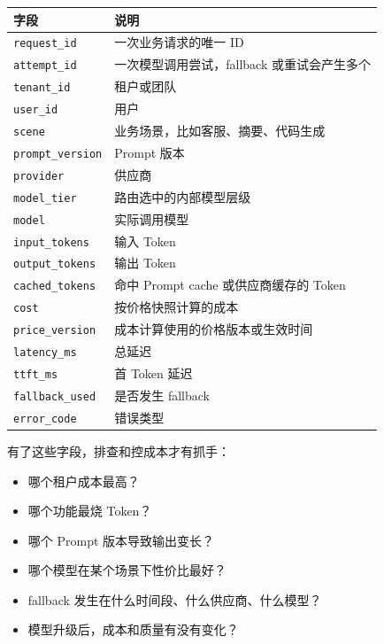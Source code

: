 \documentclass[10pt,a4paper]{ctexart}
\begin{document}
{\footnotesize
\begin{tabularx}{\textwidth}{|X|X|}
\hline
\textbf{字段} & \textbf{说明} \\
\hline
\texttt{request\_id} & 一次业务请求的唯一 ID \\
\hline
\texttt{attempt\_id} & 一次模型调用尝试，fallback 或重试会产生多个 \\
\hline
\texttt{tenant\_id} & 租户或团队 \\
\hline
\texttt{user\_id} & 用户 \\
\hline
\texttt{scene} & 业务场景，比如客服、摘要、代码生成 \\
\hline
\texttt{prompt\_version} & Prompt 版本 \\
\hline
\texttt{provider} & 供应商 \\
\hline
\texttt{model\_tier} & 路由选中的内部模型层级 \\
\hline
\texttt{model} & 实际调用模型 \\
\hline
\texttt{input\_tokens} & 输入 Token \\
\hline
\texttt{output\_tokens} & 输出 Token \\
\hline
\texttt{cached\_tokens} & 命中 Prompt cache 或供应商缓存的 Token \\
\hline
\texttt{cost} & 按价格快照计算的成本 \\
\hline
\texttt{price\_version} & 成本计算使用的价格版本或生效时间 \\
\hline
\texttt{latency\_ms} & 总延迟 \\
\hline
\texttt{ttft\_ms} & 首 Token 延迟 \\
\hline
\texttt{fallback\_used} & 是否发生 fallback \\
\hline
\texttt{error\_code} & 错误类型 \\
\hline
\end{tabularx}
}



有了这些字段，排查和控成本才有抓手：


\begin{itemize}[itemsep=2pt, topsep=4pt]
  \item 哪个租户成本最高？
  \item 哪个功能最烧 Token？
  \item 哪个 Prompt 版本导致输出变长？
  \item 哪个模型在某个场景下性价比最好？
  \item fallback 发生在什么时间段、什么供应商、什么模型？
  \item 模型升级后，成本和质量有没有变化？
\end{itemize}
\end{document}
